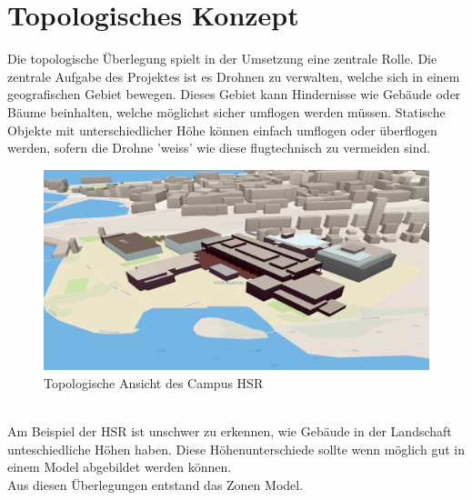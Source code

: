 \newpage
\section{Topologisches Konzept}
Die topologische Überlegung spielt in der Umsetzung eine zentrale Rolle.
Die zentrale Aufgabe des Projektes ist es Drohnen zu verwalten, welche sich in einem geografischen Gebiet bewegen. 
Dieses Gebiet kann Hindernisse wie Gebäude oder Bäume beinhalten, welche möglichst sicher umflogen werden müssen. 
Statische Objekte mit unterschiedlicher Höhe können einfach umflogen oder überflogen werden, sofern die Drohne 'weiss' wie diese flugtechnisch zu vermeiden sind. \\
\begin{figure}[h]
	\includegraphics[width=1.0\textwidth]{images/routing/topology_example.png}
	\caption{Topologische Ansicht des Campus HSR}
	\label{fig:campus-hsr}
\end{figure}
\\
Am Beispiel der HSR ist unschwer zu erkennen, wie Gebäude in der Landschaft unteschiedliche Höhen haben. Diese Höhenunterschiede sollte wenn möglich gut in einem Model abgebildet werden können. \\
Aus diesen Überlegungen entstand das Zonen Model.

